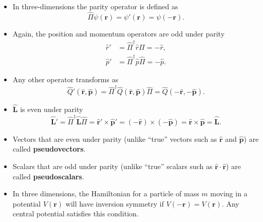 \documentclass{article}
\renewcommand{\vec}[1]{\boldsymbol{\mathbf{#1}}}
\newcommand{\uvec}[1]{\hat{\vec{#1}}}
\begin{document}
\begin{itemize}
  \item In three-dimensions the parity operator is defined as \[\hat{\Pi} \psi(\vec{r}) = \psi'(\vec{r}) = \psi(-\vec{r}).\]

  \item Again, the position and momentum operators are odd under parity \begin{align*}
          \hat{r}' & = \hat{\Pi}^\dagger \hat{r} \hat{\Pi} = -\hat{r}, \\
          \hat{p}' & = \hat{\Pi}^\dagger \hat{p} \hat{\Pi} = -\hat{p}.
        \end{align*}

  \item Any other operator transforms as \[\hat{Q}'(\uvec{r}, \uvec{p}) = \hat{\Pi}^\dagger \hat{Q}(\uvec{r}, \uvec{p}) \hat{\Pi} = \hat{Q}(-\uvec{r}, -\uvec{p}).\]

  \item $\uvec{L}$ is even under parity \[\uvec{L}' = \hat{\Pi}^\dagger \uvec{L} \hat{\Pi} = \uvec{r}' \times \uvec{p}' = (-\uvec{r}) \times (-\uvec{p}) = \uvec{r} \times \uvec{p} = \uvec{L}.\]

  \item Vectors that are even under parity (unlike ``true'' vectors such as $\uvec{r}$ and $\uvec{p}$) are called \textbf{pseudovectors}.

  \item Scalars that are odd under parity (unlike ``true'' scalars such as $\uvec{r} \cdot \uvec{r}$) are called \textbf{pseudoscalars}.

  \item In three dimensions, the Hamiltonian for a particle of mass $m$ moving in a potential $V(\vec{r})$ will have inversion symmetry if $V(-\vec{r}) = V(\vec{r})$. Any central potential satisfies this condition.
\end{itemize}
\end{document}
